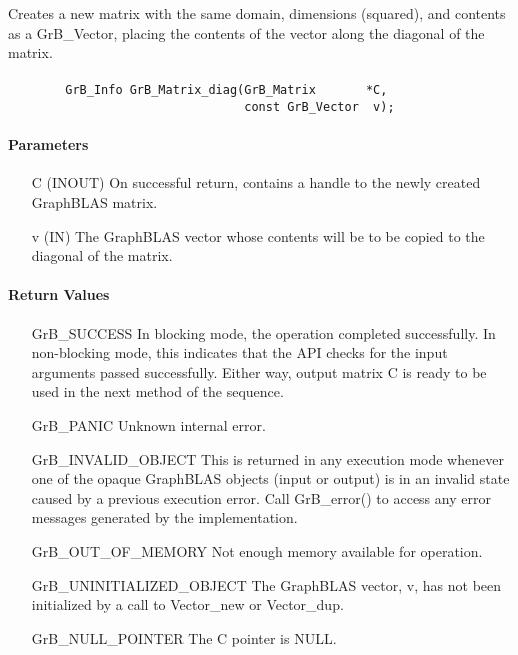 Creates a new matrix with the same domain, dimensions (squared), and contents 
as a {\sf GrB\_Vector}, placing the contents of the vector along the diagonal 
of the matrix.

\paragraph{\syntax}

\begin{verbatim}
        GrB_Info GrB_Matrix_diag(GrB_Matrix       *C,
                                 const GrB_Vector  v);
\end{verbatim}

\paragraph{Parameters}

\begin{itemize}[leftmargin=1.1in]
    \item[{\sf C}] ({\sf INOUT}) On successful return, contains a handle to 
                                 the newly created GraphBLAS matrix.
    \item[{\sf v}] ({\sf IN})    The GraphBLAS vector whose contents will be
                                 to be copied to the diagonal of the matrix.
\end{itemize}


\paragraph{Return Values}

\begin{itemize}[leftmargin=2.1in]
    \item[{\sf GrB\_SUCCESS}]         In blocking mode, the operation completed
    successfully. In non-blocking mode, this indicates that the API checks 
    for the input arguments passed successfully. Either way, output matrix 
    {\sf C} is ready to be used in the next method of the sequence.

    \item[{\sf GrB\_PANIC}]           Unknown internal error.
    
    \item[{\sf GrB\_INVALID\_OBJECT}] This is returned in any execution mode 
    whenever one of the opaque GraphBLAS objects (input or output) is in an invalid 
    state caused by a previous execution error.  Call {\sf GrB\_error()} to access 
    any error messages generated by the implementation.

    \item[{\sf GrB\_OUT\_OF\_MEMORY}] Not enough memory available for operation.
    
    \item[{\sf GrB\_UNINITIALIZED\_OBJECT}]  The GraphBLAS vector, {\sf v}, has 
    not been initialized by a call to {\sf Vector\_new} or {\sf Vector\_dup}.
    
    \item[{\sf GrB\_NULL\_POINTER}]   The {\sf C} pointer is {\sf NULL}.
\end{itemize}

